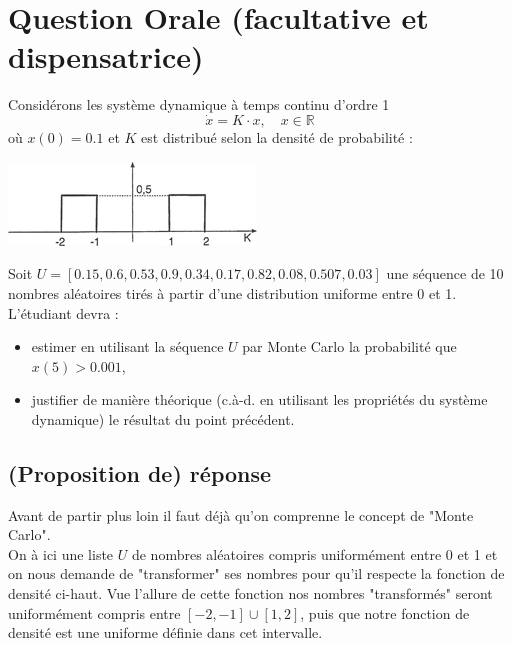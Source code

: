 \documentclass[11pt,a4paper]{report}
\begin{document}
	\section*{Question Orale (facultative et dispensatrice) }
		Considérons les système dynamique à temps continu d'ordre 1
		\[
			\dot{x} = K \cdot x, \quad x \in \mathbb R
		\]
		où $x(0) = 0.1$ et $K$ est distribué selon la densité de probabilité :
		\begin{center}
			\includegraphics[scale=1]{graphique-Q-orale}
		\end{center}
		Soit $U = [0.15, 0.6, 0.53, 0.9, 0.34, 0.17, 0.82, 0.08, 0.507, 0.03]$ une séquence de 10 nombres aléatoires tirés à partir d'une distribution uniforme entre 0 et 1.\\
		L'étudiant devra : 
		\begin{itemize}
		
		\item estimer en utilisant la séquence $U$ par Monte Carlo la probabilité que $x(5) > 0.001$,
		\item justifier de manière théorique (c.à-d. en utilisant les propriétés du système dynamique) le résultat du point précédent.
		\end{itemize}
		\pagebreak
		
		\subsection*{(Proposition de) réponse}
			Avant de partir plus loin il faut déjà qu'on comprenne le concept de "Monte Carlo".\\
			
			On à ici une liste $U$ de nombres aléatoires compris uniformément entre 0 et 1 et on nous demande de "transformer" ses nombres pour qu'il respecte la fonction de densité ci-haut. Vue l'allure de cette fonction nos nombres "transformés" seront uniformément compris entre $[-2,-1] \cup [1, 2]$, puis que notre fonction de densité est une uniforme définie dans cet intervalle.\\
			
\end{document}
